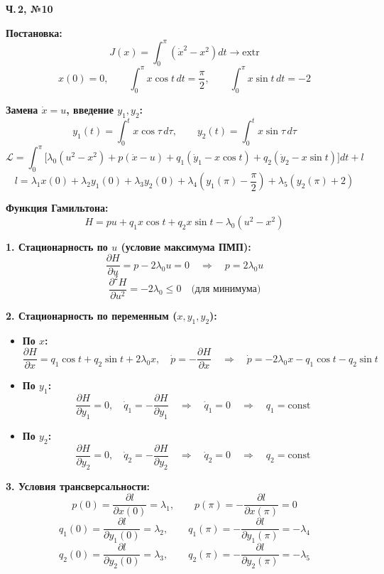 \documentclass[12pt,a4paper]{article}
\begin{document}
\begin{center}
    \textbf{\large Ч.\,2, №10}
\end{center}

\noindent
\textbf{Постановка:}
\[
J(x) = \int_0^\pi (\dot{x}^2 - x^2) dt \to \text{extr}
\]
\[
x(0) = 0, \qquad \int_0^\pi x \cos t \, dt = \frac{\pi}{2}, \qquad \int_0^\pi x \sin t \, dt = -2
\]

\noindent
\textbf{Замена \(\dot{x} = u\), введение \(y_1, y_2\):}
\[
y_1(t) = \int_0^t x \cos \tau \, d\tau, \qquad y_2(t) = \int_0^t x \sin \tau \, d\tau
\]
\[
\mathcal{L} = \int_0^\pi \bigl[ \lambda_0(u^2 - x^2) + p(\dot{x} - u) + q_1(\dot{y}_1 - x \cos t) + q_2(\dot{y}_2 - x \sin t) \bigr] dt + l
\]
\[
l = \lambda_1 x(0) + \lambda_2 y_1(0) + \lambda_3 y_2(0) + \lambda_4\left(y_1(\pi) - \frac{\pi}{2}\right) + \lambda_5(y_2(\pi) + 2)
\]

\noindent
\textbf{Функция Гамильтона:}
\[
H = pu + q_1 x \cos t + q_2 x \sin t - \lambda_0(u^2 - x^2)
\]

\vspace{0.3cm}
\noindent
\textbf{1. Стационарность по \(u\) (условие максимума ПМП):}
\[
\frac{\partial H}{\partial u} = p - 2\lambda_0 u = 0 \quad \Rightarrow \quad p = 2\lambda_0 u
\]
\[
\frac{\partial^2 H}{\partial u^2} = -2\lambda_0 \le 0 \quad \text{(для минимума)}
\]

\noindent
\textbf{2. Стационарность по переменным (\(x, y_1, y_2\)):}
\begin{itemize}
    \item \textbf{По \(x\):}
    \[
    \frac{\partial H}{\partial x} = q_1 \cos t + q_2 \sin t + 2\lambda_0 x, \quad \dot{p} = -\frac{\partial H}{\partial x} \quad \Rightarrow \quad \dot{p} = -2\lambda_0 x - q_1 \cos t - q_2 \sin t
    \]
    \item \textbf{По \(y_1\):}
    \[
    \frac{\partial H}{\partial y_1} = 0, \quad \dot{q}_1 = -\frac{\partial H}{\partial y_1} \quad \Rightarrow \quad \dot{q}_1 = 0 \quad \Rightarrow \quad q_1 = \text{const}
    \]
    \item \textbf{По \(y_2\):}
    \[
    \frac{\partial H}{\partial y_2} = 0, \quad \dot{q}_2 = -\frac{\partial H}{\partial y_2} \quad \Rightarrow \quad \dot{q}_2 = 0 \quad \Rightarrow \quad q_2 = \text{const}
    \]
\end{itemize}

\noindent
\textbf{3. Условия трансверсальности:}
\[
p(0) = \frac{\partial l}{\partial x(0)} = \lambda_1, \qquad p(\pi) = -\frac{\partial l}{\partial x(\pi)} = 0
\]
\[
q_1(0) = \frac{\partial l}{\partial y_1(0)} = \lambda_2, \qquad q_1(\pi) = -\frac{\partial l}{\partial y_1(\pi)} = -\lambda_4
\]
\[
q_2(0) = \frac{\partial l}{\partial y_2(0)} = \lambda_3, \qquad q_2(\pi) = -\frac{\partial l}{\partial y_2(\pi)} = -\lambda_5
\]
\end{document}
